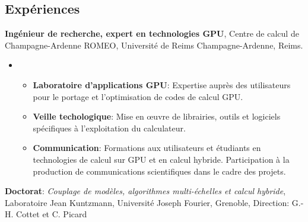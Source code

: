 \documentclass[]{cv}
\date{}
\providecommand{\tightlist}{%
  \setlength{\itemsep}{0pt}\setlength{\parskip}{0pt}}
\begin{document}
\subsection{Expériences}\label{expuxe9riences}

\begin{description}
\tightlist
\item[Depuis 01/2015]
\textbf{Ingénieur de recherche, expert en technologies GPU}, Centre de
calcul de Champagne-Ardenne ROMEO, Université de Reims
Champagne-Ardenne, Reims.
\end{description}

\begin{itemize}
\item
  \begin{itemize}
  \tightlist
  \item
    \textbf{Laboratoire d'applications GPU}: Expertise auprès des
    utilisateurs pour le portage et l'optimisation de codes de calcul
    GPU.
  \item
    \textbf{Veille techologique}: Mise en œuvre de librairies, outils et
    logiciels spécifiques à l'exploitation du calculateur.
  \item
    \textbf{Communication}: Formations aux utilisateurs et étudiants en
    technologies de calcul sur GPU et en calcul hybride. Participation à
    la production de communications scientifiques dans le cadre des
    projets.
  \end{itemize}
\end{itemize}

\begin{description}
\tightlist
\item[10/2011 -- 12/2014]
\textbf{Doctorat}: \emph{Couplage de modèles, algorithmes multi-échelles
et calcul hybride}, Laboratoire Jean Kuntzmann, Université Joseph
Fourier, Grenoble, Direction: G.-H. Cottet et C. Picard
\end{description}
\end{document}

